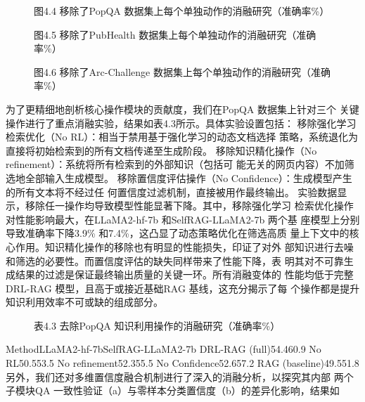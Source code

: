 \documentclass[12pt,a4paper,openright,UTF8]{ctexbook}
\begin{document}
\begin{figure}[htbp]
\centering
{}
\caption{图4.4 移除了PopQA 数据集上每个单独动作的消融研究（准确率\%）}
\end{figure}

\begin{figure}[htbp]
\centering
{}
\caption{图4.5 移除了PubHealth 数据集上每个单独动作的消融研究（准确率\%）}
\end{figure}

\begin{figure}[htbp]
\centering
{}
\caption{图4.6 移除了Arc-Challenge 数据集上每个单独动作的消融研究（准确率\%）}
\end{figure}

为了更精细地剖析核心操作模块的贡献度，我们在PopQA 数据集上针对三个 关键操作进行了重点消融实验，结果如表4.3所示。具体实验设置包括： 移除强化学习检索优化（No RL）：相当于禁用基于强化学习的动态文档选择 策略，系统退化为直接将初始检索到的所有文档传递至生成阶段。 移除知识精化操作（No refinement）：系统将所有检索到的外部知识（包括可 能无关的网页内容）不加筛选地全部输入生成模型。 移除置信度评估操作（No Confidence）：生成模型产生的所有文本将不经过任 何置信度过滤机制，直接被用作最终输出。 实验数据显示，移除任一操作均导致模型性能显著下降。其中，移除强化学习 检索优化操作对性能影响最大，在LLaMA2-hf-7b 和SelfRAG-LLaMA2-7b 两个基 座模型上分别导致准确率下降3.9\% 和7.4\%，这凸显了动态策略优化在筛选高质 量上下文中的核心作用。知识精化操作的移除也有明显的性能损失，印证了对外 部知识进行去噪和筛选的必要性。而置信度评估的缺失同样带来了性能下降，表 明其对不可靠生成结果的过滤是保证最终输出质量的关键一环。所有消融变体的 性能均低于完整DRL-RAG 模型，且高于或接近基础RAG 基线，这充分揭示了每 个操作都是提升知识利用效率不可或缺的组成部分。

\begin{figure}[htbp]
\centering
{}
\caption{表4.3 去除PopQA 知识利用操作的消融研究（准确率\%）}
\end{figure}

MethodLLaMA2-hf-7bSelfRAG-LLaMA2-7b DRL-RAG (full)54.460.9 No RL50.553.5 No refinement52.355.5 No Confidence52.657.2 RAG (baseline)49.551.8 另外，我们还对多维置信度融合机制进行了深入的消融分析，以探究其内部 两个子模块QA 一致性验证（a）与零样本分类置信度（b）的差异化影响，结果如
\end{document}
